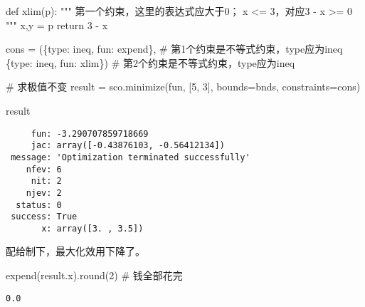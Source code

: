 \documentclass[
  letterpaper,
  DIV=11,
  numbers=noendperiod]{scrreprt}
\newenvironment{Shaded}{\begin{snugshade}}{\end{snugshade}}
\newcommand{\BuiltInTok}[1]{\textcolor[rgb]{0.00,0.23,0.31}{#1}}
\newcommand{\CommentTok}[1]{\textcolor[rgb]{0.37,0.37,0.37}{#1}}
\newcommand{\ControlFlowTok}[1]{\textcolor[rgb]{0.00,0.23,0.31}{#1}}
\newcommand{\DecValTok}[1]{\textcolor[rgb]{0.68,0.00,0.00}{#1}}
\newcommand{\KeywordTok}[1]{\textcolor[rgb]{0.00,0.23,0.31}{#1}}
\newcommand{\NormalTok}[1]{\textcolor[rgb]{0.00,0.23,0.31}{#1}}
\newcommand{\OperatorTok}[1]{\textcolor[rgb]{0.37,0.37,0.37}{#1}}
\newcommand{\StringTok}[1]{\textcolor[rgb]{0.13,0.47,0.30}{#1}}
\begin{document}
\begin{Shaded}
\begin{Highlighting}[]
\KeywordTok{def}\NormalTok{ xlim(p):}
    \CommentTok{"""}
\CommentTok{    第一个约束，这里的表达式应大于0；}
\CommentTok{    x \textless{}= 3，对应3 {-} x \textgreater{}= 0}
\CommentTok{    """}
\NormalTok{    x,y }\OperatorTok{=}\NormalTok{ p}
    \ControlFlowTok{return} \DecValTok{3} \OperatorTok{{-}}\NormalTok{ x}

\NormalTok{cons }\OperatorTok{=}\NormalTok{ (\{}\StringTok{\textquotesingle{}type\textquotesingle{}}\NormalTok{: }\StringTok{\textquotesingle{}ineq\textquotesingle{}}\NormalTok{, }\StringTok{\textquotesingle{}fun\textquotesingle{}}\NormalTok{: expend\}, }\CommentTok{\# 第1个约束是不等式约束，type应为\textquotesingle{}ineq\textquotesingle{}}
\NormalTok{        \{}\StringTok{\textquotesingle{}type\textquotesingle{}}\NormalTok{: }\StringTok{\textquotesingle{}ineq\textquotesingle{}}\NormalTok{, }\StringTok{\textquotesingle{}fun\textquotesingle{}}\NormalTok{: xlim\})   }\CommentTok{\# 第2个约束是不等式约束，type应为\textquotesingle{}ineq\textquotesingle{}}

\CommentTok{\# 求极值不变}
\NormalTok{result }\OperatorTok{=}\NormalTok{ sco.minimize(fun, [}\DecValTok{5}\NormalTok{, }\DecValTok{3}\NormalTok{],  bounds}\OperatorTok{=}\NormalTok{bnds, constraints}\OperatorTok{=}\NormalTok{cons)}

\NormalTok{result}
\end{Highlighting}
\end{Shaded}

\begin{verbatim}
     fun: -3.290707859718669
     jac: array([-0.43876103, -0.56412134])
 message: 'Optimization terminated successfully'
    nfev: 6
     nit: 2
    njev: 2
  status: 0
 success: True
       x: array([3. , 3.5])
\end{verbatim}

配给制下，最大化效用下降了。

\begin{Shaded}
\begin{Highlighting}[]
\NormalTok{expend(result.x).}\BuiltInTok{round}\NormalTok{(}\DecValTok{2}\NormalTok{) }\CommentTok{\# 钱全部花完}
\end{Highlighting}
\end{Shaded}

\begin{verbatim}
0.0
\end{verbatim}
\end{document}
